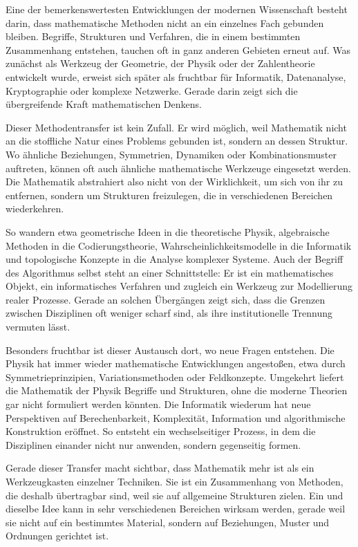 Eine der bemerkenswertesten Entwicklungen der modernen Wissenschaft besteht darin, dass mathematische Methoden nicht an ein einzelnes Fach gebunden bleiben. Begriffe, Strukturen und Verfahren, die in einem bestimmten Zusammenhang entstehen, tauchen oft in ganz anderen Gebieten erneut auf. Was zunächst als Werkzeug der Geometrie, der Physik oder der Zahlentheorie entwickelt wurde, erweist sich später als fruchtbar für Informatik, Datenanalyse, Kryptographie oder komplexe Netzwerke. Gerade darin zeigt sich die übergreifende Kraft mathematischen Denkens.

Dieser Methodentransfer ist kein Zufall. Er wird möglich, weil Mathematik nicht an die stoffliche Natur eines Problems gebunden ist, sondern an dessen Struktur. Wo ähnliche Beziehungen, Symmetrien, Dynamiken oder Kombinationsmuster auftreten, können oft auch ähnliche mathematische Werkzeuge eingesetzt werden. Die Mathematik abstrahiert also nicht von der Wirklichkeit, um sich von ihr zu entfernen, sondern um Strukturen freizulegen, die in verschiedenen Bereichen wiederkehren.

So wandern etwa geometrische Ideen in die theoretische Physik, algebraische Methoden in die Codierungstheorie, Wahrscheinlichkeitsmodelle in die Informatik und topologische Konzepte in die Analyse komplexer Systeme. Auch der Begriff des Algorithmus selbst steht an einer Schnittstelle: Er ist ein mathematisches Objekt, ein informatisches Verfahren und zugleich ein Werkzeug zur Modellierung realer Prozesse. Gerade an solchen Übergängen zeigt sich, dass die Grenzen zwischen Disziplinen oft weniger scharf sind, als ihre institutionelle Trennung vermuten lässt.

Besonders fruchtbar ist dieser Austausch dort, wo neue Fragen entstehen. Die Physik hat immer wieder mathematische Entwicklungen angestoßen, etwa durch Symmetrieprinzipien, Variationsmethoden oder Feldkonzepte. Umgekehrt liefert die Mathematik der Physik Begriffe und Strukturen, ohne die moderne Theorien gar nicht formuliert werden könnten. Die Informatik wiederum hat neue Perspektiven auf Berechenbarkeit, Komplexität, Information und algorithmische Konstruktion eröffnet. So entsteht ein wechselseitiger Prozess, in dem die Disziplinen einander nicht nur anwenden, sondern gegenseitig formen.

Gerade dieser Transfer macht sichtbar, dass Mathematik mehr ist als ein Werkzeugkasten einzelner Techniken. Sie ist ein Zusammenhang von Methoden, die deshalb übertragbar sind, weil sie auf allgemeine Strukturen zielen. Ein und dieselbe Idee kann in sehr verschiedenen Bereichen wirksam werden, gerade weil sie nicht auf ein bestimmtes Material, sondern auf Beziehungen, Muster und Ordnungen gerichtet ist.

